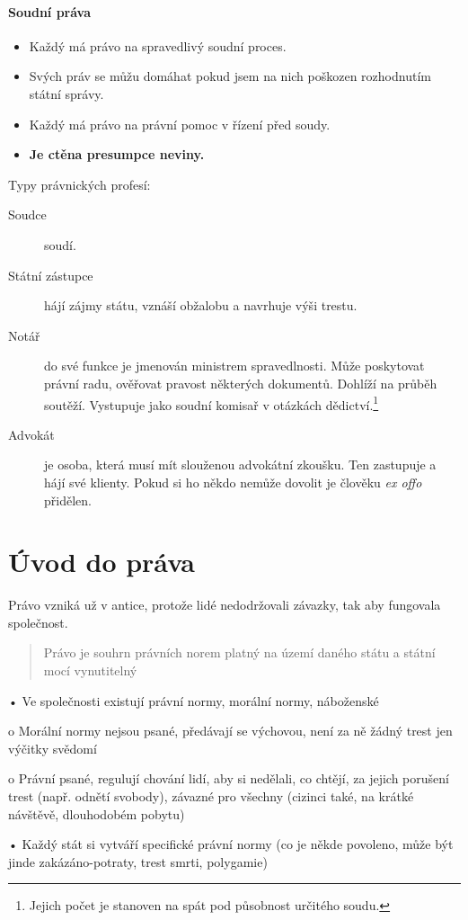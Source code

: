 \documentclass[10pt,a4paper,
twoside,%
]{report}
\begin{document}
\subsubsection{Soudní práva}
\begin{itemize}
\item Každý má právo na spravedlivý soudní proces.
\item Svých práv se můžu domáhat pokud jsem na nich poškozen rozhodnutím státní správy.
\item Každý má právo na právní pomoc v řízení před soudy.
\item\textsf{\textbf{Je ctěna presumpce neviny.}} 
\end{itemize}
Typy právnických profesí:
\begin{description}
\item[Soudce] soudí.
\item[Státní zástupce]hájí zájmy státu, vznáší obžalobu a navrhuje výši trestu.
\item[Notář] do své funkce je jmenován ministrem spravedlnosti. Může poskytovat právní radu, ověřovat pravost některých dokumentů. Dohlíží na průběh soutěží. Vystupuje jako \textsf{soudní komisař} v otázkách dědictví.\footnote{Jejich počet je stanoven na spát pod působnost určitého soudu.}
\item[Advokát] je osoba, která musí mít slouženou advokátní zkoušku. Ten zastupuje a hájí své klienty. Pokud si ho někdo nemůže dovolit je člověku \emph{ex offo} přidělen.
\end{description}
\chapter{Úvod do práva}
Právo vzniká už v antice, protože lidé nedodržovali závazky, tak aby fungovala společnost.
\begin{quote}\textsf{
Právo je souhrn právních norem platný na území daného státu a státní mocí vynutitelný}
\end{quote}
•	Ve společnosti existují právní normy, morální normy, náboženské

o	Morální normy nejsou psané, předávají se výchovou, není za ně žádný trest jen výčitky svědomí

o	Právní psané, regulují chování lidí, aby si nedělali, co chtějí, za jejich porušení trest (např. odnětí svobody), závazné pro všechny (cizinci také, na krátké návštěvě, dlouhodobém pobytu)

•	Každý stát si vytváří specifické právní normy (co je někde povoleno, může být jinde zakázáno-potraty, trest smrti, polygamie)
\end{document}
